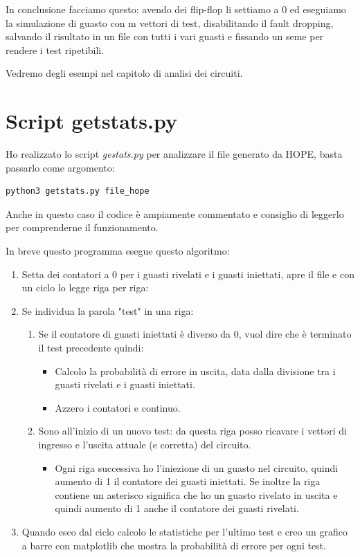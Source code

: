 \documentclass[12pt, letterpaper]{article}
\begin{document}
In conclusione facciamo questo: avendo dei flip-flop li settiamo a 0 ed eseguiamo la simulazione di guasto con m vettori di test, disabilitando il fault dropping, salvando il risultato in un file con tutti i vari guasti e fissando un seme per rendere i test ripetibili.

Vedremo degli esempi nel capitolo di analisi dei circuiti.

\section{Script getstats.py}

Ho realizzato lo script \textit{gestats.py} per analizzare il file generato da HOPE, basta passarlo come argomento:

\begin{lstlisting}
python3 getstats.py file_hope
\end{lstlisting}

Anche in questo caso il codice è ampiamente commentato e consiglio di leggerlo per comprenderne il funzionamento. 

In breve questo programma esegue questo algoritmo: 

\begin{enumerate}
\item Setta dei contatori a 0 per i guasti rivelati e i guasti iniettati, apre il file e con un ciclo lo legge riga per riga:
\item Se individua la parola "test" in una riga:

\begin{enumerate}
\item Se il contatore di guasti iniettati è diverso da 0, vuol dire che è terminato il test precedente quindi:
\begin{itemize}
\item Calcolo la probabilità di errore in uscita, data dalla divisione tra i guasti rivelati e i guasti iniettati.
\item Azzero i contatori e continuo.
\end{itemize}
\item Sono all'inizio di un nuovo test: da questa riga posso ricavare i vettori di ingresso e l'uscita attuale (e corretta) del circuito.
\begin{itemize}
\item Ogni riga successiva ho l'iniezione di un guasto nel circuito, quindi aumento di 1 il contatore dei guasti iniettati. Se inoltre la riga contiene un asterisco significa che ho un guasto rivelato in uscita e quindi aumento di 1 anche il contatore dei guasti rivelati.
\end{itemize}
\end{enumerate}

\item Quando esco dal ciclo calcolo le statistiche per l'ultimo test e creo un grafico a barre con matplotlib che mostra la probabilità di errore per ogni test.
\end{enumerate}
\end{document}
